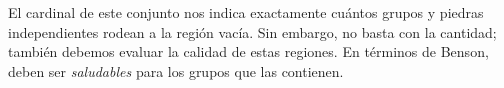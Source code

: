 El cardinal de este conjunto nos indica exactamente cuántos grupos y piedras independientes rodean a la región vacía. 
Sin embargo, no basta con la cantidad; también debemos evaluar la calidad de estas regiones. En términos de Benson, deben ser \textit{saludables} para los grupos que las contienen.

